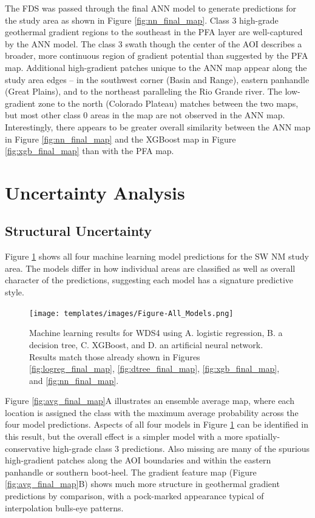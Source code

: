 The FDS was passed through the final ANN model to generate predictions for the study area as shown in Figure \ref{fig:nn_final_map}. Class 3 high-grade geothermal gradient regions to the southeast in the \citet{bielicki_hydrogeolgic_2015} PFA layer are well-captured by the ANN model. The class 3 swath though the center of the AOI describes a broader, more continuous region of gradient potential than suggested by the PFA map. Additional high-gradient patches unique to the ANN map appear along the study area edges – in the southwest corner (Basin and Range), eastern panhandle (Great Plains), and to the northeast paralleling the Rio Grande river. The low-gradient zone to the north (Colorado Plateau) matches between the two maps, but most other class 0 areas in the \citeauthor{bielicki_hydrogeolgic_2015} map are not observed in the ANN map. Interestingly, there appears to be greater overall similarity between the ANN map in Figure \ref{fig:nn_final_map} and the XGBoost map in Figure \ref{fig:xgb_final_map} than with the PFA map.

\section{Uncertainty Analysis}\label{ch5:uncertainty_analysis}
\subsection{Structural Uncertainty}\label{ch5:structural_uncertainty}
Figure \ref{fig:combined_maps} shows all four machine learning model predictions for the SW NM study area. The models differ in how individual areas are classified as well as overall character of the predictions, suggesting each model has a signature predictive style.

\begin{figure}[!htp]
\centering
\texttt{[image: templates/images/Figure-All\_Models.png]}
\caption[Combined machine learning results]{Machine learning results for WDS4 using A. logistic regression, B. a decision tree, C. XGBoost, and D. an artificial neural network. Results match those already shown in Figures \ref{fig:logreg_final_map}, \ref{fig:dtree_final_map}, \ref{fig:xgb_final_map}, and \ref{fig:nn_final_map}.}
\label{fig:combined_maps}
\end{figure}

Figure \ref{fig:avg_final_map}A illustrates an ensemble average map, where each location is assigned the class with the maximum average probability across the four model predictions. Aspects of all four models in Figure \ref{fig:combined_maps} can be identified in this result, but the overall effect is a simpler model with a more spatially-conservative high-grade class 3 predictions. Also missing are many of the spurious high-gradient patches along the AOI boundaries and within the eastern panhandle or southern boot-heel. The \citeauthor{bielicki_hydrogeolgic_2015} gradient feature map (Figure \ref{fig:avg_final_map}B) shows much more structure in geothermal gradient predictions by comparison, with a pock-marked appearance typical of interpolation bulls-eye patterns.

